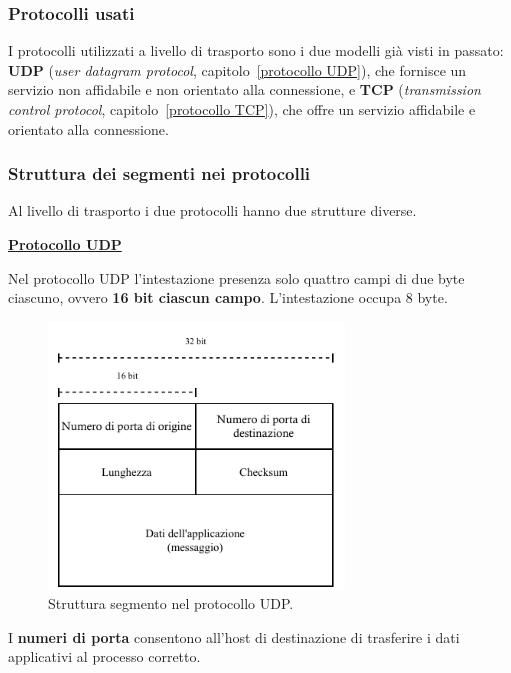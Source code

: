\documentclass[a4paper]{article}
\begin{document}
	\subsubsection{Protocolli usati}
	
	I protocolli utilizzati a livello di trasporto sono i due modelli già visti in passato: \textbf{UDP} (\emph{user datagram protocol}, capitolo~\ref{protocollo UDP}), che fornisce un servizio non affidabile e non orientato alla connessione, e \textbf{TCP} (\emph{transmission control protocol}, capitolo~\ref{protocollo TCP}), che offre un servizio affidabile e orientato alla connessione.
	
	\newpage
	
	\subsubsection{Struttura dei segmenti nei protocolli}
	
	Al livello di trasporto i due protocolli hanno due strutture diverse.\newline
	
	\noindent
	\textcolor{Red3}{\textbf{\underline{Protocollo UDP}}}\newline
	
	\noindent
	Nel protocollo UDP l'intestazione presenza solo quattro campi di due byte ciascuno, ovvero \textbf{16 bit ciascun campo}. L'intestazione occupa 8 byte.
	\begin{figure}[!htp]
		\centering
		\includegraphics[width=0.7\textwidth]{img/segmento_udp.pdf}
		\caption{Struttura segmento nel protocollo UDP.}
	\end{figure}

	\noindent
	I \textbf{numeri di porta} consentono all’host di destinazione di trasferire i dati applicativi al processo corretto.\newline
\end{document}
